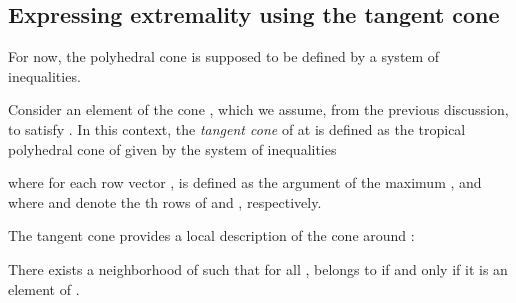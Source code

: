 \documentclass[proceedings]{stacs}
\begin{document}
\subsection{Expressing extremality using the tangent cone} 

For now, the polyhedral cone  is supposed to be defined by a system  of  inequalities. 


Consider an element  of the cone ,
which we assume, from the previous discussion,
to satisfy .
In this context, the \emph{tangent cone} of  at  is defined as the tropical polyhedral cone  of  given by the system of inequalities

where for each row vector ,  is defined as the argument of the maximum , and where  and  denote the th rows of  and , respectively.


The tangent cone  provides a local description of the cone  around :
\begin{proposition}\label{prop:tangent_cone}
There exists a neighborhood  of  such that for all ,  belongs to  if and only if it is an element of .
\end{proposition}
\end{document}
